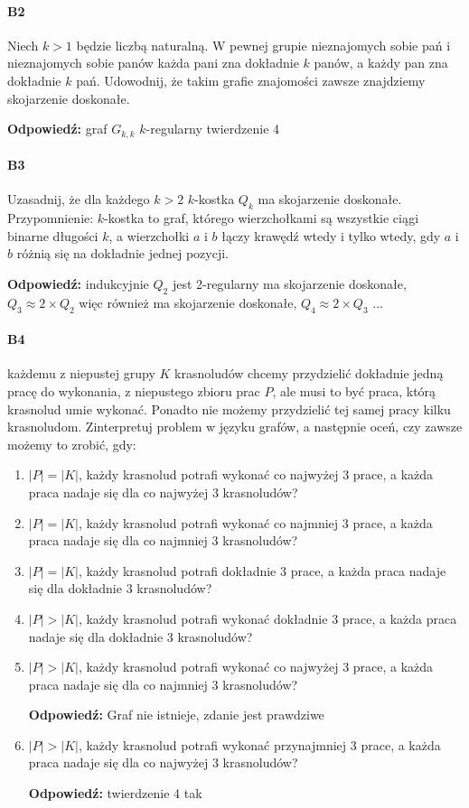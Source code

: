 \paragraph{B2} Niech $k > 1$ będzie liczbą naturalną. W pewnej grupie nieznajomych sobie pań i nieznajomych sobie panów każda pani zna dokładnie $k$ panów, a każdy pan zna dokładnie $k$ pań. Udowodnij, że takim grafie znajomości zawsze znajdziemy skojarzenie doskonałe.

\textbf{Odpowiedź: } graf $G_{k,k}$ $k$-regularny twierdzenie 4
\paragraph{B3} Uzasadnij, że dla każdego $k > 2$ $k$-kostka $Q_k$ ma skojarzenie doskonałe. Przypomnienie: $k$-kostka to graf, którego wierzchołkami są wszystkie ciągi binarne długości $k$, a wierzchołki $a$ i $b$ łączy krawędź wtedy i tylko wtedy, gdy $a$ i $b$ różnią się na dokładnie jednej pozycji.

\textbf{Odpowiedź: } indukcyjnie $Q_2$ jest 2-regularny ma skojarzenie doskonałe, $Q_3\approx 2\times Q_2$ więc również ma skojarzenie doskonałe, $Q_4\approx 2\times Q_3$ ...
\paragraph{B4} każdemu z niepustej grupy $K$ krasnoludów chcemy przydzielić dokładnie jedną pracę do wykonania, z niepustego zbioru prac $P$, ale musi to być praca, którą krasnolud umie wykonać. Ponadto nie możemy przydzielić tej samej pracy kilku krasnoludom. Zinterpretuj problem w języku grafów, a następnie oceń, czy zawsze możemy to zrobić, gdy:
\begin{enumerate}[label=\alph*)]
\item $|P| = |K|$, każdy krasnolud potrafi wykonać co najwyżej 3 prace, a każda praca nadaje się dla co najwyżej 3 krasnoludów?
\item $|P| = |K|$, każdy krasnolud potrafi wykonać co najmniej 3 prace, a każda praca nadaje się dla co najmniej 3 krasnoludów?
\item $|P| = |K|$, każdy krasnolud potrafi dokładnie 3 prace, a każda praca nadaje się dla dokładnie 3 krasnoludów?
\item $|P| > |K|$, każdy krasnolud potrafi wykonać dokładnie 3 prace, a każda praca nadaje się dla dokładnie 3 krasnoludów?
\item $|P| > |K|$, każdy krasnolud potrafi wykonać co najwyżej 3 prace, a każda praca nadaje się dla co najmniej 3 krasnoludów?

\textbf{Odpowiedź: }Graf nie istnieje, zdanie jest prawdziwe
\item $|P| > |K|$, każdy krasnolud potrafi wykonać przynajmniej 3 prace, a każda praca nadaje się dla co najwyżej 3 krasnoludów?

\textbf{Odpowiedź: } twierdzenie 4 tak
\end{enumerate}

